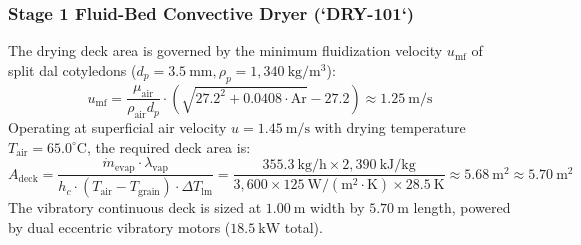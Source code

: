 \documentclass[10pt,a4paper]{article}
\begin{document}
\subsubsection{Stage 1 Fluid-Bed Convective Dryer (`DRY-101`)}
The drying deck area is governed by the minimum fluidization velocity $u_{\mathrm{mf}}$ of split dal cotyledons ($d_p = 3.5\ \mathrm{mm}, \rho_p = 1,340\ \mathrm{kg/m^3}$):
\begin{equation}
u_{\mathrm{mf}} = \frac{\mu_{\mathrm{air}}}{\rho_{\mathrm{air}} d_p} \cdot \left( \sqrt{27.2^2 + 0.0408 \cdot \mathrm{Ar}} - 27.2 \right) \approx 1.25\ \mathrm{m/s}
\end{equation}
Operating at superficial air velocity $u = 1.45\ \mathrm{m/s}$ with drying temperature $T_{\mathrm{air}} = 65.0^\circ\mathrm{C}$, the required deck area is:
\begin{equation}
A_{\mathrm{deck}} = \frac{\dot{m}_{\mathrm{evap}} \cdot \lambda_{\mathrm{vap}}}{h_c \cdot (T_{\mathrm{air}} - T_{\mathrm{grain}}) \cdot \Delta T_{\mathrm{lm}}} = \frac{355.3\ \mathrm{kg/h} \times 2,390\ \mathrm{kJ/kg}}{3,600 \times 125\ \mathrm{W/(m^2 \cdot K)} \times 28.5\ \mathrm{K}} \approx 5.68\ \mathrm{m^2} \approx \mathbf{5.70\ \mathrm{m^2}}
\end{equation}
The vibratory continuous deck is sized at $1.00\ \mathrm{m}$ width by $5.70\ \mathrm{m}$ length, powered by dual eccentric vibratory motors ($18.5\ \mathrm{kW}$ total).
\end{document}
